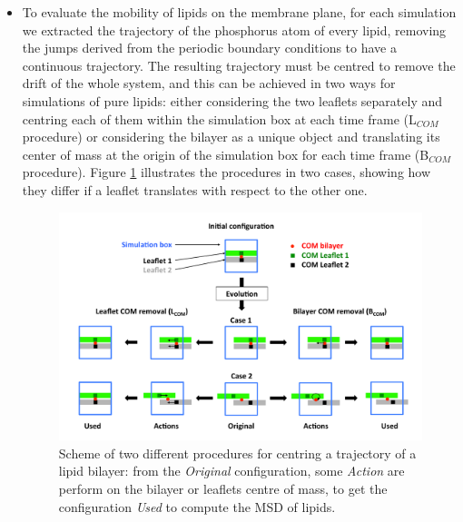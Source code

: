 \begin{itemize}
\item To evaluate the mobility of lipids on the membrane plane, for each simulation we extracted the trajectory of the phosphorus atom of every lipid, removing the jumps derived from the periodic boundary conditions to have a continuous trajectory. The resulting trajectory must be centred to remove the drift of the whole system, and this can be achieved in two ways for simulations of pure lipids: either considering the two leaflets separately and centring each of them within the simulation box at each time frame (L$_{COM}$ procedure) or considering the bilayer as a unique object and translating its center of mass at the origin of the simulation box for each time frame (B$_{COM}$ procedure). Figure \ref{fig:com_rem_scheme} illustrates the procedures in two cases, showing how they differ if a leaflet translates with respect to the other one.
%
\begin{figure}[t!]
\centering
\includegraphics[width=0.95\linewidth]{3results_capsule/pics/diff_comrem.pdf} 
\caption[Procedure for diffusion coefficient computation]{Scheme of two different procedures for centring a trajectory of a lipid bilayer: from the \emph{Original} configuration, some \emph{Action} are perform on the bilayer or leaflets centre of mass, to get the configuration \emph{Used} to compute the MSD of lipids.}
\label{fig:com_rem_scheme}
\end{figure}


\end{itemize}
